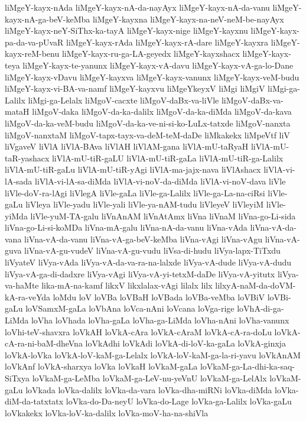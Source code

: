 {liMgeY-kayx-nAda
liMgeY-kayx-nA-da-nayAyx
liMgeY-kayx-nA-da-vanu
liMgeY-kayx-nA-ga-beV-keMba
liMgeY-kayxna
liMgeY-kayx-na-neV-neM-be-nayAyx
liMgeY-kayx-neY-SiThx-ka-tayA
liMgeY-kayx-nige
liMgeY-kayxnu
liMgeY-kayx-pa-da-va-pUvaR
liMgeY-kayx-rAda
liMgeY-kayx-rA-dare
liMgeY-kayxra
liMgeY-kayx-reM-benu
liMgeY-kayx-ru-ga-LA-geyedx
liMgeY-kayxshacx
liMgeY-kayx-teya
liMgeY-kayx-te-yanunx
liMgeY-kayx-vA-davu
liMgeY-kayx-vA-ga-lo-Dane
liMgeY-kayx-vDavu
liMgeY-kayxva
liMgeY-kayx-vanunx
liMgeY-kayx-veM-budu
liMgeY-kayx-vi-BA-va-namf
liMgeY-kayxvu
liMgeYkeyxV
liMgi
liMgiV
liMgi-ga-Lalilx
liMgi-ga-Lelalx
liMgoV-cacxte
liMgoV-daBx-va-liVle
liMgoV-daBx-va-mataH
liMgoV-daka
liMgoV-da-ka-dalilx
liMgoV-da-ka-diMda
liMgoV-da-kava
liMgoV-da-ka-veM-budu
liMgoV-da-ka-ve-ni-si-ko-LuLx-tatxde
liMgoV-nanxta
liMgoV-nanxtaM
liMgoV-tapx-tayx-va-deM-teM-daDe
liMkakekx
liMpeVtf
liV
liVgaveV
liVlA
liVlA-BAva
liVlAH
liVlAM-gana
liVlA-mU-taRyaH
liVlA-mU-taR-yashacx
liVlA-mU-tiR-gaLU
liVlA-mU-tiR-gaLa
liVlA-mU-tiR-ga-Lalilx
liVlA-mU-tiR-gaLu
liVlA-mU-tiR-yAgi
liVlA-ma-jajx-nava
liVlAshacx
liVlA-vi-lA-sada
liVlA-vi-lA-sa-diMda
liVlA-vi-noV-da-diMda
liVlA-vi-noV-dava
liVle
liVle-doV-ra-lAgi
liVlegA
liVle-gaLa
liVle-ga-Lalilx
liVle-ga-La-na-ciRsi
liVle-gaLu
liVleya
liVle-yadu
liVle-yali
liVle-ya-nAM-tudu
liVleyeV
liVleyiM
liVle-yiMda
liVle-yuM-TA-galu
liVnAnAM
liVnAtAmx
liVna
liVnaM
liVna-go-Li-sida
liVna-go-Li-si-koMDa
liVna-mA-galu
liVna-nA-da-vanu
liVna-vAda
liVna-vA-da-vana
liVna-vA-da-vanu
liVna-vA-ga-beV-keMba
liVna-vAgi
liVna-vAgu
liVna-vA-guva
liVna-vA-gu-vudeV
liVna-vA-gu-vudu
liVsa-di-hudu
liVya-lapx-TiTxdu
liVyateV
liVya-vAda
liVya-vA-da-va-ra-na-lalxde
liVya-vA-dude
liVya-vA-dudu
liVya-vA-ga-di-dadxre
liVya-vAgi
liVya-vA-yi-tetxM-daDe
liVya-vA-yitutx
liVya-va-haMte
lika-mA-na-kamf
likxV
likxlalax-vAgi
lilalx
lilx
lilxyA-naM-da-doVM-kA-ra-veYda
loMdu
loV
loVBa
loVBaH
loVBada
loVBa-veMba
loVBiV
loVBi-gaLu
loVSamxM-gaLa
loVbAna
loVca-nAni
loVcana
loVga-rige
loVhA-di-ga-LiMda
loVha
loVhada
loVha-gaLa
loVha-ga-LiMda
loVha-nAni
loVha-vanunx
loVhi-teV-shavxra
loVkAH
loVkA-cAra
loVkA-cAraM
loVkA-cA-ra-doLu
loVkA-cA-ra-ni-baM-dheVna
loVkAdhi
loVkAdi
loVkA-di-loV-ka-gaLa
loVkA-ginxja
loVkA-loVka
loVkA-loV-kaM-ga-Lelalx
loVkA-loV-kaM-ga-la-ri-yavu
loVkAnAM
loVkAnf
loVkA-sharxya
loVka
loVkaH
loVkaM-gaLa
loVkaM-ga-La-dhi-ka-saq-SiTxya
loVkaM-ga-LeMba
loVkaM-ga-LeV-nu-yeVnU
loVkaM-ga-LelAlx
loVkaM-gaLu
loVkada
loVka-dalilx
loVka-da-vara
loVka-dha-miRNi
loVka-diMda
loVka-diM-da-tatxtatx
loVka-do-Da-neyU
loVka-do-Lage
loVka-ga-Lalilx
loVka-gaLu
loVkakekx
loVka-loV-ka-dalilx
loVka-moV-ha-na-shiVla
}
